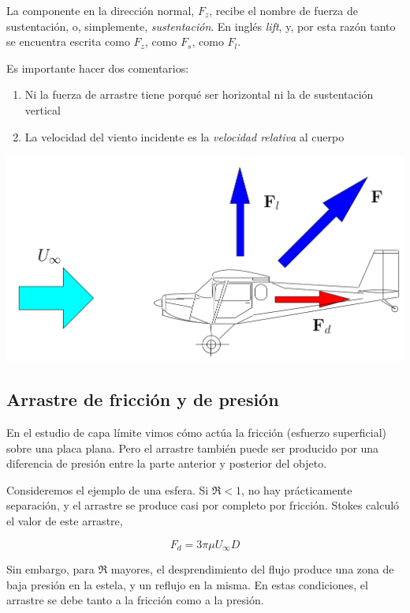 	La componente en la dirección normal, $F_{z}$, recibe el nombre de
	fuerza de sustentación, o, simplemente, \textit{sustentación}. En
	inglés \textit{lift}, y, por esta razón tanto se encuentra escrita
	como $F_{z}$, como $F_{s}$, como $F_{l}$.
	
	Es importante hacer dos comentarios: 
	\begin{enumerate}
		\item Ni la fuerza de arrastre tiene porqué ser horizontal ni la de sustentación
		vertical 
		\item La velocidad del viento incidente es la \textit{velocidad relativa}
		al cuerpo 
	\end{enumerate}
\begin{center}
	\includegraphics[width=\linewidth]{TeX_files/chapter09-Externo/plane}
\end{center}


\subsection{Arrastre de fricción y de presión}

	
	En el estudio de capa límite vimos cómo actúa la fricción (esfuerzo
	superficial) sobre una placa plana. Pero el arrastre también puede
	ser producido por una diferencia de presión entre la parte anterior
	y posterior del objeto.
	
	Consideremos el ejemplo de una esfera. Si $\Re<1$, no hay prácticamente
	separación, y el arrastre se produce casi por completo por fricción.
	Stokes calculó el valor de este arrastre, 
	
\begin{equation}
		F_{d}=3\pi\mu U_{\infty}D
\end{equation}
	
	
	Sin embargo, para $\Re$ mayores, el desprendimiento del flujo produce
	una zona de baja presión en la estela, y un reflujo en la misma. En
	estas condiciones, el arrastre se debe tanto a la fricción como a
	la presión.


